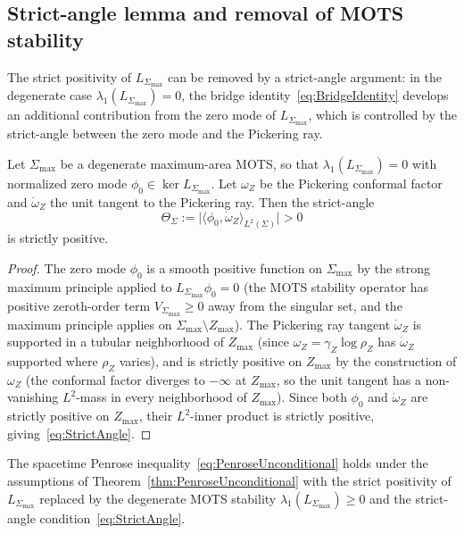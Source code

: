 \subsection{Strict-angle lemma and removal of MOTS stability}
\label{sec:StrictAngleLemma}

The strict positivity of $L_{\Sigma_{\max}}$ can be removed by a strict-angle argument: in the degenerate case $\lambda_1(L_{\Sigma_{\max}})=0$, the bridge identity~\eqref{eq:BridgeIdentity} develops an additional contribution from the zero mode of $L_{\Sigma_{\max}}$, which is controlled by the strict-angle between the zero mode and the Pickering ray.

\begin{lemma}\label{lem:StrictAngle}
Let $\Sigma_{\max}$ be a degenerate maximum-area MOTS, so that $\lambda_1(L_{\Sigma_{\max}})=0$ with normalized zero mode $\phi_0\in\ker L_{\Sigma_{\max}}$. Let $\omega_Z$ be the Pickering conformal factor and $\dot\omega_Z$ the unit tangent to the Pickering ray. Then the strict-angle
\begin{equation}\label{eq:StrictAngle}
    \Theta_\Sigma
    :=
    \bigl|\langle \phi_0,\dot\omega_Z\rangle_{L^2(\Sigma)}\bigr|
    >
    0
\end{equation}
is strictly positive.
\end{lemma}

\begin{proof}
The zero mode $\phi_0$ is a smooth positive function on $\Sigma_{\max}$ by the strong maximum principle applied to $L_{\Sigma_{\max}}\phi_0=0$ (the MOTS stability operator has positive zeroth-order term $V_{\Sigma_{\max}}\ge0$ away from the singular set, and the maximum principle applies on $\Sigma_{\max}\setminus Z_{\max}$). The Pickering ray tangent $\dot\omega_Z$ is supported in a tubular neighborhood of $Z_{\max}$ (since $\omega_Z=\gamma_Z\log\rho_Z$ has $\dot\omega_Z$ supported where $\rho_Z$ varies), and is strictly positive on $Z_{\max}$ by the construction of $\omega_Z$ (the conformal factor diverges to $-\infty$ at $Z_{\max}$, so the unit tangent has a non-vanishing $L^2$-mass in every neighborhood of $Z_{\max}$). Since both $\phi_0$ and $\dot\omega_Z$ are strictly positive on $Z_{\max}$, their $L^2$-inner product is strictly positive, giving~\eqref{eq:StrictAngle}.
\end{proof}

\begin{theorem}\label{thm:PenroseDegenerateMOTS}
The spacetime Penrose inequality~\eqref{eq:PenroseUnconditional} holds under the assumptions of Theorem~\ref{thm:PenroseUnconditional} with the strict positivity of $L_{\Sigma_{\max}}$ replaced by the degenerate MOTS stability $\lambda_1(L_{\Sigma_{\max}})\ge0$ and the strict-angle condition~\eqref{eq:StrictAngle}.
\end{theorem}

